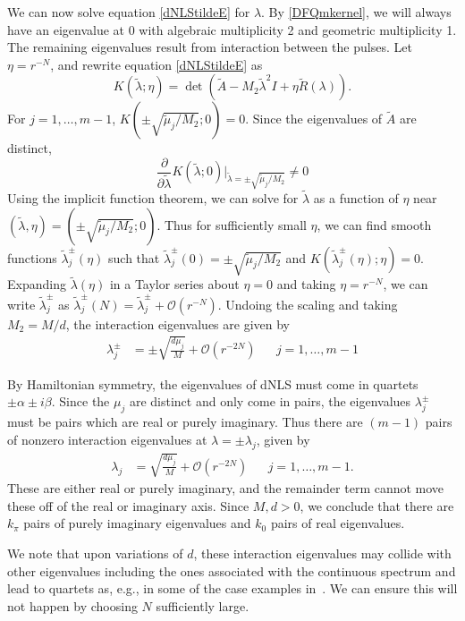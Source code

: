 \documentclass[12pt]{article}
\begin{document}
We can now solve equation \eqref{dNLStildeE} for $\lambda$. By \eqref{DFQmkernel}, we will always have an eigenvalue at 0 with algebraic multiplicity 2 and geometric multiplicity 1. The remaining eigenvalues result from interaction between the pulses. Let $\eta = r^{-N}$, and rewrite equation \eqref{dNLStildeE} as 
\begin{equation}\label{dNLStildeE2}
K(\tilde{\lambda}; \eta) = \det(\tilde{A} - M_2 \tilde{\lambda}^2 I + \eta \tilde{R}(\lambda)).
\end{equation}
For $j = 1, \dots, m-1$, $K(\pm \sqrt{\tilde{\mu}_j / M_2 }; 0) = 0$. Since the eigenvalues of $\tilde{A}$ are distinct, 
\[
\frac{\partial}{\partial \tilde{\lambda}} K(\tilde{\lambda}; 0)\Big|_{\tilde{\lambda} = \pm \sqrt{\tilde{\mu}_j / M_2 }} \neq 0
\]
Using the implicit function theorem, we can solve for $\tilde{\lambda}$ as a function of $\eta$ near $(\tilde{\lambda}, \eta) = (\pm \sqrt{\tilde{\mu}_j / M_2 }; 0)$. Thus for sufficiently small $\eta$, we can find smooth functions $\tilde{\lambda}_j^\pm(\eta)$ such that $\tilde{\lambda}_j^\pm(0) = \pm \sqrt{\tilde{\mu}_j / M_2 }$ and $K(\tilde{\lambda}_j^\pm(\eta); \eta) = 0$. Expanding $\tilde{\lambda}(\eta)$ in a Taylor series about $\eta = 0$ and taking $\eta = r^{-N}$, we can write $\tilde{\lambda}_j^\pm$ as $\tilde{\lambda}_j^\pm(N) = \tilde{\lambda}_j^\pm + \mathcal{O}(r^{-N})$. Undoing the scaling and taking $M_2 = M/d$, the interaction eigenvalues are given by
\begin{align*}
\lambda^\pm_j &= \pm \sqrt{\frac{d \mu_j}{M}} + \mathcal{O}(r^{-2N}) && j = 1, \dots, m-1 
\end{align*}

By Hamiltonian symmetry, the eigenvalues of dNLS must come in quartets $\pm \alpha \pm i \beta$. Since the $\mu_j$ are distinct and only come in pairs, the eigenvalues $\lambda_j^\pm$ must be pairs which are real or purely imaginary. Thus there are $(m - 1)$ pairs of nonzero interaction eigenvalues at $\lambda = \pm \lambda_j$, given by 
\begin{align*}
\lambda_j &= \sqrt{\frac{d \mu_j}{M}} + \mathcal{O}(r^{-2N}) && j = 1, \dots, m-1.
\end{align*}
These are either real or purely imaginary, and the remainder term cannot move these off of the real or imaginary axis. Since $M, d > 0$, we conclude that there are $k_\pi$ pairs of purely imaginary eigenvalues and $k_0$ pairs of real eigenvalues.

We note that upon variations of $d$,
these interaction eigenvalues may collide with other eigenvalues including
the ones associated with the continuous spectrum
and lead to quartets as, e.g., in some of the
case examples in~\cite{Pelinovsky2005}. We can ensure this will not happen by choosing $N$ sufficiently large.
\end{document}
